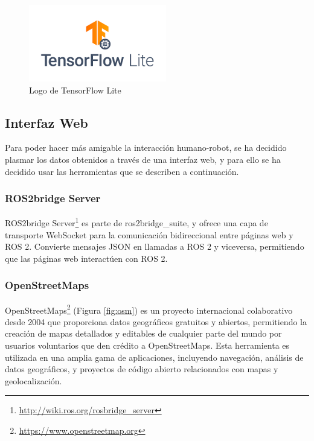 \begin{figure} [h!]
	\begin{center}
		\includegraphics[width=6cm]{figs/tflite.png}
	\end{center}
	\caption{Logo de TensorFlow Lite} %
	\label{fig:tflite}
\end{figure}


\subsection{Interfaz Web}

Para poder hacer más amigable la interacción humano-robot, se ha decidido plasmar los datos obtenidos a través de una interfaz web, y para ello se ha decidido usar las herramientas que se describen a continuación.
 
\subsubsection{ROS2bridge Server}

ROS2bridge Server\footnote{\url{http://wiki.ros.org/rosbridge_server}} es parte de ros2bridge\_suite, y ofrece una capa de transporte WebSocket para la comunicación bidireccional entre páginas web y ROS 2. Convierte mensajes JSON en llamadas a ROS 2 y viceversa, permitiendo que las páginas web interactúen con ROS 2. 

\subsubsection{OpenStreetMaps}

OpenStreetMaps\footnote{\url{https://www.openstreetmap.org}} (Figura \ref{fig:osm}) es un proyecto internacional colaborativo desde 2004 que proporciona datos geográficos gratuitos y abiertos, permitiendo la creación de mapas detallados y editables de cualquier parte del mundo por usuarios voluntarios que den crédito a OpenStreetMaps. Esta herramienta es utilizada en una amplia gama de aplicaciones, incluyendo navegación, análisis de datos geográficos, y proyectos de código abierto relacionados con mapas y geolocalización.


